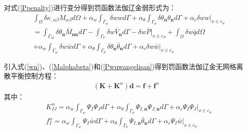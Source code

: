 对式(\ref{Ppenalty})进行变分得到罚函数法伽辽金弱形式为：
\begin{equation}
\begin{split}
    &\int_{\Omega}\delta\kappa_{,\alpha\beta}M_{\alpha\beta}d\Omega
    +\alpha_w\int_{\Gamma_w}\delta wwd\Gamma+\alpha_{\theta}\int_{\Gamma_{\theta}}\delta\theta_{\pmb{n}}\theta_{\pmb{n}}d\Gamma+\alpha_c\delta ww\vert_{x\in c_w}\\
    &=\int_{\Gamma_M}\delta\theta_{\pmb{n}}\bar{M}_{\pmb{nn}}d\Gamma-\int_{\Gamma_V}\delta w\bar{V}_{\pmb{n}}d\Gamma-\delta w\bar{P}\vert_{x\in c_P}+\int_{\Omega}\delta w\bar{q}d\Omega\\
    &+\alpha_w\int_{\Gamma_w}\delta w\bar{w}d\Gamma+\alpha_{\theta}\int_{\Gamma_{\theta}}\delta\theta_{\pmb{n}}\bar{\theta}_{\pmb{n}}d\Gamma+\alpha_c\delta w\bar{w}\vert_{x\in c_w}
\end{split}
\end{equation}\par
引入式(\ref{wn})、(\ref{Malphabeta})和(\ref{Pwuwangelisan})得到罚函数法伽辽金无网格离散平衡控制方程：
\begin{equation}
\begin{split}
    (\pmb{K}+\pmb{K}^{\alpha})\pmb{d}=\pmb{f}+\pmb{f}^{\alpha}
\end{split}
\end{equation}
其中：
\begin{equation}
\begin{split}
   &K^{\alpha}_{IJ}=\alpha_w\int_{\Gamma_w}\Psi_I\Psi_Jd\Gamma+\alpha_{\theta}\int_{\Gamma_{\theta}}\Psi_{I,\pmb n}\Psi_{J,\pmb n}d\Gamma+\alpha_c\Psi_I\Psi_J\vert_{x\in c_w}\\
&f^{\alpha}_I=\alpha_w\int_{\Gamma_w}\Psi_I\bar{w}d\Gamma+\alpha_{\theta}\int_{\Gamma_{\theta}}\Psi_{I,\pmb n}\bar{\theta}_{\pmb n}d\Gamma+\alpha_c\Psi_I\bar{w}\vert_{x\in c_w}
\end{split}
\end{equation}\par
